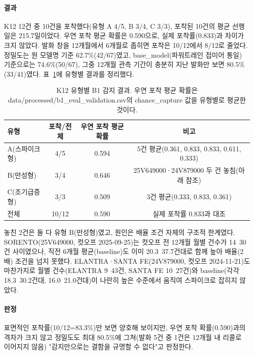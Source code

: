 \documentclass[11pt]{article}
\begin{document}
\paragraph{결과} K12 12건 중 10건을 포착했다(유형 A 4/5, B 3/4, C 3/3), 포착된 10건의 평균 선행일은 215.7일이었다.
우연 포착 평균 확률은 0.590으로, 실제 포착률(0.833)과 차이가 크지 않았다. 발화 창을 12개월에서 6개월로 좁히면 포착은 10/12에서 8/12로 줄었다.
정밀도는 원 모델명 기준 62.7\%(42/67)였고, base\_model(파워트레인 접미어 통일) 기준으로는 74.6\%(50/67), 그중 12개월 관측 기간이 충분히 지난 발화만 보면 80.5\%(33/41)였다.
표~\ref{tab:b1-summary}에 유형별 결과를 정리했다.

\begin{table}[H]
\centering
\small
\begin{tabular}{lccc}
\toprule
유형 & 포착/전체 & 우연 포착 평균 확률 & 비고 \\
\midrule
A(스파이크형) & 4/5 & 0.594 & 5건 평균(0.361, 0.833, 0.833, 0.611, 0.333) \\
B(만성형) & 3/4 & 0.646 & 25V649000·24V879000 두 건 놓침(아래 참조) \\
C(조기급증형) & 3/3 & 0.509 & 3건 평균(0.333, 0.833, 0.361) \\
\midrule
전체 & 10/12 & 0.590 & 실제 포착률 0.833과 대조 \\
\bottomrule
\end{tabular}
\caption{K12 유형별 B1 감지 결과. 우연 포착 평균 확률은 data/processed/b1\_eval\_validation.csv의 chance\_capture 값을 유형별로 평균한 것이다.}
\label{tab:b1-summary}
\end{table}

놓친 2건은 둘 다 유형 B(만성형)였고, 원인은 배율 조건 자체의 구조적 한계였다. SORENTO(25V649000, 컷오프 2025-09-25)는 컷오프 전 12개월 월별 건수가 14~30건 사이였으나, 직전 6개월 평균(baseline)도 이미 20.3~37.7건대로 함께 높아 배율(2배) 조건을 넘지 못했다. ELANTRA·SANTA FE(24V879000, 컷오프 2024-11-21)도 마찬가지로 월별 건수(ELANTRA 9~43건, SANTA FE 10~27건)와 baseline(각각 18.3~30.2건대, 16.0~21.0건대)이 나란히 높은 수준에서 움직여 스파이크로 잡히지 않았다.

\paragraph{판정} 표면적인 포착률(10/12=83.3\%)만 보면 양호해 보이지만, 우연 포착 확률(0.590)과의 격차가 크지 않고 정밀도도 최대 80.5\%에 그쳐(발화 5건 중 1건은 12개월 내 리콜로 이어지지 않음) "감지만으로는 결함을 규명할 수 없다"고 판정한다.
\end{document}
